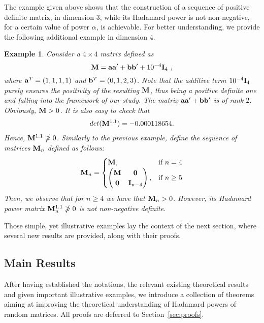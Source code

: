 \documentclass[conference,letterpaper]{IEEEtran}
\numberwithin{equation}{section}
\newcommand{\lbl}{\label}
\newcommand{\bd}{\bold}
\newcommand{\beaa}{\begin{eqnarray*}}
\newcommand{\eeaa}{\end{eqnarray*}}
\newtheorem{example}{{\sc Example}}[section]
\begin{document}
\medskip

The example given above shows that the construction of a sequence of positive definite matrix, in dimension $3$, while its Hadamard power is not non-negative, for a certain value of power $\alpha$, is achievable. 
For better understanding, we provide the following additional example in dimension $4$. 

\medskip

\begin{example}\lbl{good_example} 
Consider a $4\times 4$ matrix defined as 
$$\bd{M}=\bd{a}\bd{a}'+\bd{b}\bd{b}' + 10^{-4}\bd{I}_4 \ ,$$ 
where $\bd{a}^T=(1,1,1,1)$ and $\bd{b}^T=(0,1,2,3)$. 
Note that the additive term $10^{-4}\bd{I}_4$ purely ensures the positivity of the resulting $\bd{M}$, thus being a positive definite one and falling into the framework of our study.
The matrix $\bd{a}\bd{a}'+\bd{b}\bd{b}'$  is of rank $2$. Obviously, $\bd{M}>0$. 
It is also easy to check that
\beaa
\mbox{det}(\bd{M}^{1.1})=-0.000118654.
\eeaa
Hence, $\bd{M}^{1.1}\ngeqslant 0$.
Similarly to the previous example, define the sequence of matrices $\bd{M}_n$ defined as follows:
\[
    \bd{M}_n= 
\begin{cases}
    \bd{M},& \text{if } n=4\\
    \begin{pmatrix}
\bd{M} & \bd{0}\\
\bd{0} & \bd{I}_{n-4}
\end{pmatrix},              & \text{if } n\geq 5
\end{cases}
\]
Then, we observe that for $n\geq 4$ we have that $\bd{M}_n>0$. 
However, its Hadamard power matrix $\bd{M}_n^{1.1}\ngeqslant 0$ is not non-negative definite.
\end{example}
\medskip
Those simple, yet illustrative examples lay the context of the next section, where several new results are provided, along with their proofs.

\subsection{Main Results}\lbl{Section_main}
After having established the notations, the relevant existing theoretical results and given important illustrative examples, we introduce a collection of theorems aiming at improving the theoretical understanding of Hadamard powers of random matrices.
All proofs are deferred to Section~\ref{sec:proofs}.
\end{document}
